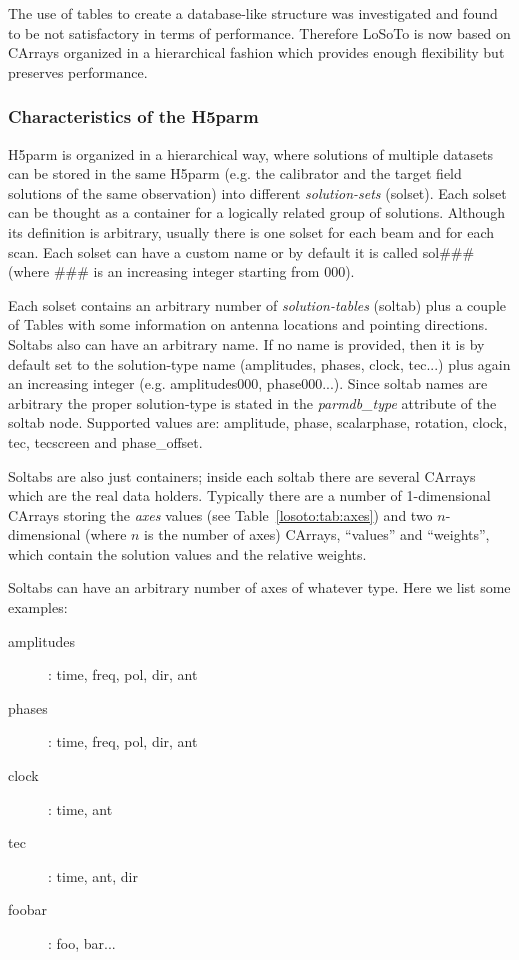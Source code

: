 \documentclass[]{article}
\def \losoto {LoSoTo}
\begin{document}
The use of tables to create a database-like structure was investigated and found to be not satisfactory in terms of performance. Therefore \losoto{} is now based on CArrays organized in a hierarchical fashion which provides enough flexibility but preserves performance.

\subsubsection{Characteristics of the H5parm}
\label{losoto:characteristics_h5parm}

H5parm is organized in a hierarchical way, where solutions of multiple datasets can be stored in the same H5parm (e.g. the calibrator and the target field solutions of the same observation) into different \textit{solution-sets} (solset). Each solset can be thought as a container for a logically related group of solutions. Although its definition is arbitrary, usually there is one solset for each beam and for each scan. Each solset can have a custom name or by default it is called sol\#\#\# (where \#\#\# is an increasing integer starting from 000).

Each solset contains an arbitrary number of \textit{solution-tables} (soltab) plus a couple of Tables with some information on antenna locations and pointing directions. Soltabs also can have an arbitrary name. If no name is provided, then it is by default set to the solution-type name (amplitudes, phases, clock, tec...) plus again an increasing integer (e.g. amplitudes000, phase000...). Since soltab names are arbitrary the proper solution-type is stated in the \textit{parmdb\_type} attribute of the soltab node. Supported values are: amplitude, phase, scalarphase, rotation, clock, tec, tecscreen and phase\_offset.

Soltabs are also just containers; inside each soltab there are several CArrays which are the real data holders. Typically there are a number of 1-dimensional CArrays storing the \textit{axes} values (see Table~\ref{losoto:tab:axes}) and two $n$-dimensional (where $n$ is the number of axes) CArrays, ``values'' and ``weights'', which contain the solution values and the relative weights.

Soltabs can have an arbitrary number of axes of whatever type. Here we list some examples:
\begin{description}
 \item[amplitudes]: time, freq, pol, dir, ant
 \item[phases]: time, freq, pol, dir, ant
 \item[clock]: time, ant
 \item[tec]: time, ant, dir
 \item[foobar]: foo, bar...
\end{description}
\end{document}
